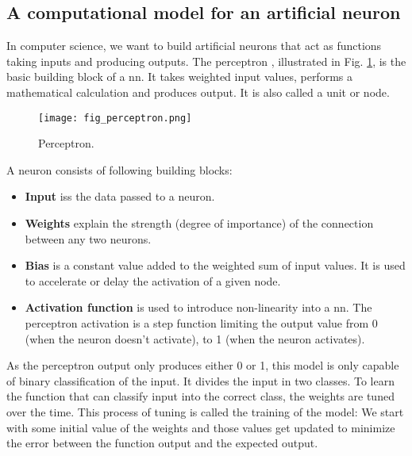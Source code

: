 \subsection{A computational model for an artificial neuron}
In computer science, we want to build artificial neurons that act as functions taking inputs and producing outputs. The perceptron \cite{rosenblatt1958perceptron, minsky2017perceptrons}, illustrated in Fig. \ref{fig:perceptron}, is the basic building block of a \acrfull{nn}. It takes weighted input values, performs a mathematical calculation and produces output. It is also called a unit or node.
\begin{figure}[ht]
    \begin{center}
    \texttt{[image: fig\_perceptron.png]}
    \caption{Perceptron.}
    \label{fig:perceptron}
    \end{center}
\end{figure}
A neuron consists of following building blocks:
\begin{itemize}
    \item \textbf{Input} iss the data passed to a neuron.
    \item \textbf{Weights} explain the strength (degree of importance) of the connection between any two neurons.
    \item \textbf{Bias} is a constant value added to the weighted sum of input values. It is used to accelerate or delay the activation of a given node.
    \item \textbf{Activation function} is used to introduce non-linearity into a \acrshort{nn}. The perceptron activation is a step function limiting the output value from 0 (when the neuron doesn't activate), to 1 (when the neuron activates).
\end{itemize}
As the perceptron output only produces either 0 or 1, this model is only capable of binary classification of the input. It divides the input in two classes. To learn the function that can classify input into the correct class, the weights are tuned over the time. This process of tuning is called the training of the model: We start with some initial value of the weights and those values get updated to minimize the error between the function output and the expected output.

